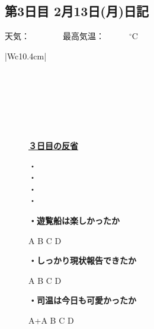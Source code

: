 \newpage

\subsection*{第3日目 2月13日(月)日記}
\vspace{0.5cm}
\centering
{}
\vspace{0.25cm}

\begin{rightline}
	{\scriptsize{天気：　　　　最高気温：　　　$ {}^\circ $C}}
\end{rightline}
\begin{table}[H]
	\centering
	\begin{tabular}{|Wc{10.4cm}|} \hline
		\\ \hline
		\\ \hline
		\\ \hline
		\\ \hline
		\\ \hline
		\\ \hline
		\\ \hline
	\end{tabular}
\end{table}

\begin{figure}[H]
	\begin{minipage}[b]{0.45\hsize}
		\begin{boxnote}
			\vspace{-0.2cm}
			\begin{center}
				\underline{\footnotesize{\textbf{３日目の反省}}}
			\end{center}
			\vspace{-0.4cm}
			
			\fontsize{12pt}{25pt}\selectfont
			・\\
			・\\
			・\\
			・
		\end{boxnote}
	\end{minipage}
	\hfill
	\begin{minipage}[b]{0.45\hsize}
		\begin{screen}
			\vspace{0.5cm}
			\scriptsize{\textbf{・遊覧船は楽しかったか}}
			\begin{center}
				A \quad B \quad C \quad D
			\end{center}
			\scriptsize{\textbf{・しっかり現状報告できたか}}
			\begin{center}
				A \quad B \quad C \quad D
			\end{center}
			\scriptsize{\textbf{・司温は今日も可愛かったか}}
			\begin{center}
				A+\quad	A \quad B \quad C \quad D
			\end{center}
			\vspace{0.05cm}
		\end{screen}
	\end{minipage}
\end{figure}